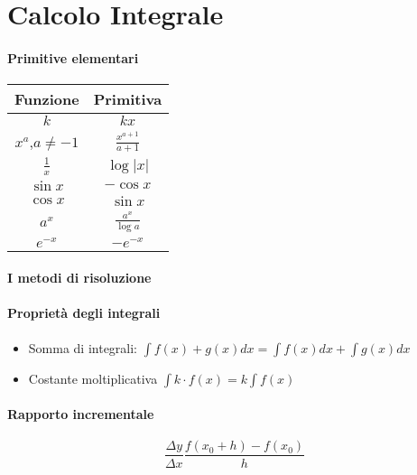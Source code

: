 \documentclass[12pt, a4paper, openany]{book}
\begin{document}
\section*{Calcolo Integrale}
\paragraph*{Primitive elementari}
\begin{tabular}{ |c|c| }
	\hline
	Funzione & Primitiva\\
	\hline
	$k$ & $kx$\\
	$x^a$,$a\neq-1$ & $\frac{x^{a+1}}{a+1}$\\
	$\frac{1}{x}$ & $\log|x|$\\
	$\sin x$ & $-\cos x$\\
	$\cos x $&$\sin x$\\
	$a^x$ & $\frac{a^x}{\log a}$\\
	\hline
	$e^{-x}$ & $-e^{-x}$\\
\end{tabular}
\paragraph*{I metodi di risoluzione}
\paragraph*{Proprietà degli integrali}
\begin{itemize}
	\item Somma di integrali: $\int f(x)+g(x) dx = \int f(x) dx + \int g(x) dx$  
	\item Costante moltiplicativa $\int k \cdot f(x) = k \int f(x)$
\end{itemize}

\paragraph*{Rapporto incrementale}
$$\frac{\Delta y}{ \Delta x}\frac{f(x_0+h)-f(x_0)}{h} $$
\end{document}
